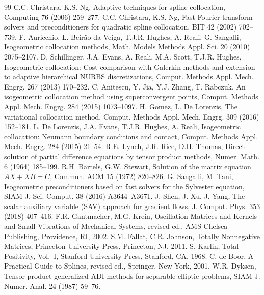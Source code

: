 \documentclass[preprint,12pt]{elsarticle}
\theoremstyle{remark}
\begin{document}
\begin{thebibliography}{99}
 C.C. Christara, K.S. Ng, Adaptive techniques for spline collocation, Computing 76 (2006) 259--277.
 C.C. Christara, K.S. Ng, Fast Fourier transform solvers and preconditioners for quadratic spline collocation, BIT 42 (2002) 702--739.
 F. Auricchio, L. Beir\~ao da Veiga, T.J.R. Hughes, A. Reali, G. Sangalli, Isogeometric collocation methods, Math. Models Methods Appl. Sci. 20 (2010) 2075--2107.
 D. Schillinger, J.A. Evans, A. Reali, M.A. Scott, T.J.R. Hughes, Isogeometric collocation: Cost comparison with Galerkin methods and extension to adaptive hierarchical NURBS discretizations, Comput. Methods Appl. Mech. Engrg. 267 (2013) 170--232.
 C. Anitescu, Y. Jia, Y.J. Zhang, T. Rabczuk, An isogeometric collocation method using superconvergent points, Comput. Methods Appl. Mech. Engrg. 284 (2015) 1073--1097.
 H. Gomez, L. De Lorenzis, The variational collocation method, Comput. Methods Appl. Mech. Engrg. 309 (2016) 152--181.
 L. De Lorenzis, J.A. Evans, T.J.R. Hughes, A. Reali, Isogeometric collocation: Neumann boundary conditions and contact, Comput. Methods Appl. Mech. Engrg. 284 (2015) 21--54.
 R.E. Lynch, J.R. Rice, D.H. Thomas, Direct solution of partial difference equations by tensor product methods, Numer. Math. 6 (1964) 185--199.
 R.H. Bartels, G.W. Stewart, Solution of the matrix equation $AX+XB=C$, Commun. ACM 15 (1972) 820--826.
 G. Sangalli, M. Tani, Isogeometric preconditioners based on fast solvers for the Sylvester equation, SIAM J. Sci. Comput. 38 (2016) A3644--A3671.
 J. Shen, J. Xu, J. Yang, The scalar auxiliary variable (SAV) approach for gradient flows, J. Comput. Phys. 353 (2018) 407--416.
 F.R. Gantmacher, M.G. Krein, Oscillation Matrices and Kernels and Small Vibrations of Mechanical Systems, revised ed., AMS Chelsea Publishing, Providence, RI, 2002.
 S.M. Fallat, C.R. Johnson, Totally Nonnegative Matrices, Princeton University Press, Princeton, NJ, 2011.
 S. Karlin, Total Positivity, Vol.~I, Stanford University Press, Stanford, CA, 1968.
 C. de Boor, A Practical Guide to Splines, revised ed., Springer, New York, 2001.
 W.R. Dyksen, Tensor product generalized ADI methods for separable elliptic problems, SIAM J. Numer. Anal. 24 (1987) 59--76.

\end{thebibliography}
\end{document}
